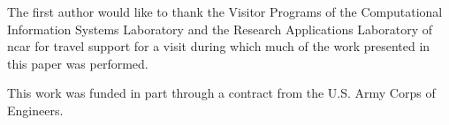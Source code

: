 


%





\begin{acks}
  The first author would like to thank the Visitor Programs of the Computational Information Systems Laboratory
  and the Research Applications Laboratory of \gls{ncar} for travel support for a visit during which much of
  the work presented in this paper was performed.

  This work was funded in part through a contract from the U.S. Army Corps of Engineers.

\end{acks}
